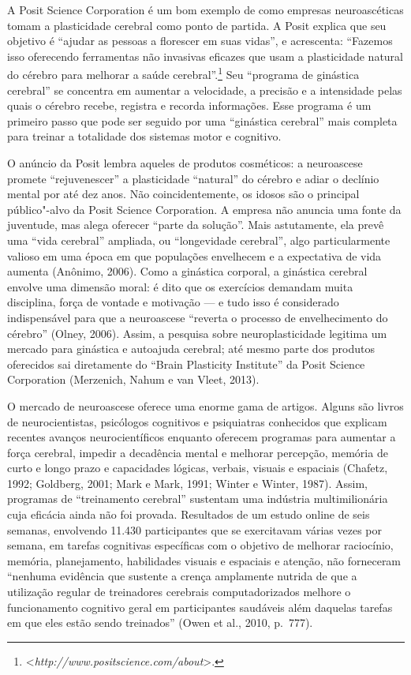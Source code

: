 A Posit Science Corporation é um bom exemplo de como empresas
neuroascéticas tomam a plasticidade cerebral como ponto de partida. A
Posit explica que seu objetivo é ``ajudar as pessoas a florescer em suas
vidas'', e acrescenta: ``Fazemos isso oferecendo ferramentas não
invasivas eficazes que usam a plasticidade natural do cérebro para
melhorar a saúde cerebral''.\footnote[13]{\textless{}\emph{http://www.positscience.com/about}\textgreater{}.} Seu ``programa de
ginástica cerebral'' se concentra em aumentar a velocidade, a precisão e
a intensidade pelas quais o cérebro recebe, registra e recorda
informações. Esse programa é um primeiro passo que pode ser seguido por
uma ``ginástica cerebral'' mais completa para treinar a totalidade dos
sistemas motor e cognitivo.

O anúncio da Posit lembra aqueles de produtos cosméticos: a neuroascese
promete ``rejuvenescer'' a plasticidade ``natural'' do cérebro e adiar o
declínio mental por até dez anos. Não coincidentemente, os idosos são o
principal público"-alvo da Posit Science Corporation. A empresa não
anuncia uma fonte da juventude, mas alega oferecer ``parte da solução''.
Mais astutamente, ela prevê uma ``vida cerebral'' ampliada, ou
``longevidade cerebral'', algo particularmente valioso em uma época em que
populações envelhecem e a expectativa de vida aumenta (Anônimo,
2006). Como a ginástica corporal, a ginástica cerebral envolve uma
dimensão moral: é dito que os exercícios demandam muita disciplina,
força de vontade e motivação --- e tudo isso é considerado indispensável
para que a neuroascese ``reverta o processo de envelhecimento do
cérebro'' (Olney, 2006). Assim, a pesquisa sobre neuroplasticidade
legitima um mercado para ginástica e autoajuda cerebral; até mesmo parte
dos produtos oferecidos sai diretamente do ``Brain Plasticity
Institute'' da Posit Science Corporation (Merzenich, Nahum e van Vleet,
2013).

O mercado de neuroascese oferece uma enorme gama de artigos. Alguns são
livros de neurocientistas, psicólogos cognitivos e
psiquiatras conhecidos que explicam recentes avanços neurocientíficos enquanto
oferecem programas para aumentar a força cerebral, impedir a decadência
mental e melhorar percepção, memória de curto e longo prazo e
capacidades lógicas, verbais, visuais e espaciais (Chafetz, 1992;
Goldberg, 2001; Mark e Mark, 1991; Winter e Winter, 1987). Assim,
programas de ``treinamento cerebral'' sustentam uma indústria
multimilionária cuja eficácia ainda não foi provada. Resultados de um
estudo online de seis semanas, envolvendo 11.430 participantes que se
exercitavam várias vezes por semana, em tarefas cognitivas específicas
com o objetivo de melhorar raciocínio, memória, planejamento,
habilidades visuais e espaciais e atenção, não forneceram ``nenhuma
evidência que sustente a crença amplamente nutrida de que a utilização
regular de treinadores cerebrais computadorizados melhore o
funcionamento cognitivo geral em participantes saudáveis além daquelas
tarefas em que eles estão sendo treinados'' (Owen et al., 2010, p.~777).

